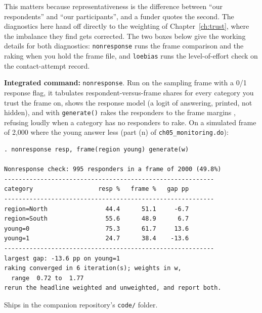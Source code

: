 \documentclass[
    a4paper,
    fontsize=10pt,
    twoside=true,
    numbers=noenddot,
]{kaobook}
\begin{document}
This matters because representativeness is the difference between \enquote{our respondents} and \enquote{our participants}, and a funder quotes the second. The diagnostics here hand off directly to the weighting of Chapter~\ref{ch:trust}, where the imbalance they find gets corrected. The two boxes below give the working details for both diagnostics: \texttt{nonresponse} runs the frame comparison and the raking when you hold the frame file, and \texttt{loebias} runs the level-of-effort check on the contact-attempt record.

\begin{kaobox}[frametitle=Package Integration: \texttt{nonresponse}]
\textbf{Integrated command:} \texttt{nonresponse}. Run on the sampling frame with a 0/1 response flag, it tabulates respondent-versus-frame shares for every category you trust the frame on, shows the response model (a logit of answering, printed, not hidden), and with \texttt{generate()} rakes the responders to the frame margins \parencite{deming1940raking}, refusing loudly when a category has no responders to rake. On a simulated frame of 2{,}000 where the young answer less (part (n) of \texttt{ch05\_monitoring.do}):
\par
{\footnotesize
\begin{verbatim}
. nonresponse resp, frame(region young) generate(w)

Nonresponse check: 995 responders in a frame of 2000 (49.8%)
----------------------------------------------------------
category                  resp %   frame %   gap pp
----------------------------------------------------------
region=North                44.4      51.1     -6.7
region=South                55.6      48.9      6.7
young=0                     75.3      61.7     13.6
young=1                     24.7      38.4    -13.6
----------------------------------------------------------
largest gap: -13.6 pp on young=1
raking converged in 6 iteration(s); weights in w,
  range  0.72 to  1.77
rerun the headline weighted and unweighted, and report both.
\end{verbatim}
}
Ships in the companion repository's \texttt{code/} folder.
\end{kaobox}
\end{document}

